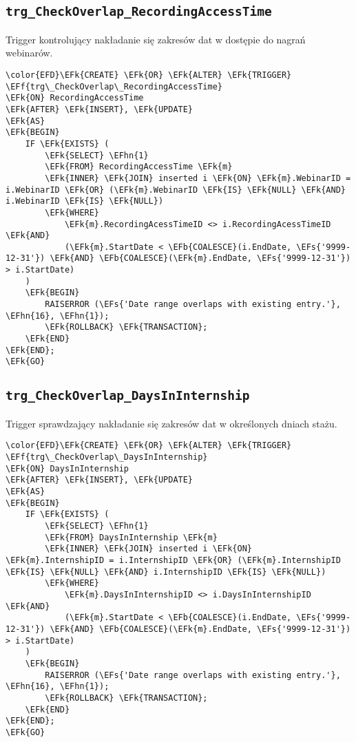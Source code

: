 \documentclass[11pt]{article}
\newcommand{\EFs}[1]{\textcolor{EFs}{#1}} %
\newcommand{\EFk}[1]{\textcolor{EFk}{\textbf{#1}}} %
\newcommand{\EFb}[1]{\textcolor{EFb}{\textbf{#1}}} %
\newcommand{\EFf}[1]{\textcolor{EFf}{#1}} %
\newcommand{\EFhn}[1]{\textcolor{EFhn}{#1}} %
\begin{document}
\subsection{\texttt{trg\_CheckOverlap\_RecordingAccessTime}}
\label{sec:org977cbdd}
Trigger kontrolujący nakładanie się zakresów dat w dostępie do nagrań webinarów.
\begin{Code}
\begin{Verbatim}
\color{EFD}\EFk{CREATE} \EFk{OR} \EFk{ALTER} \EFk{TRIGGER} \EFf{trg\_CheckOverlap\_RecordingAccessTime}
\EFk{ON} RecordingAccessTime
\EFk{AFTER} \EFk{INSERT}, \EFk{UPDATE}
\EFk{AS}
\EFk{BEGIN}
    IF \EFk{EXISTS} (
        \EFk{SELECT} \EFhn{1} 
        \EFk{FROM} RecordingAccessTime \EFk{m}
        \EFk{INNER} \EFk{JOIN} inserted i \EFk{ON} \EFk{m}.WebinarID = i.WebinarID \EFk{OR} (\EFk{m}.WebinarID \EFk{IS} \EFk{NULL} \EFk{AND} i.WebinarID \EFk{IS} \EFk{NULL})
        \EFk{WHERE} 
            \EFk{m}.RecordingAcessTimeID <> i.RecordingAcessTimeID \EFk{AND}
            (\EFk{m}.StartDate < \EFb{COALESCE}(i.EndDate, \EFs{'9999-12-31'}) \EFk{AND} \EFb{COALESCE}(\EFk{m}.EndDate, \EFs{'9999-12-31'}) > i.StartDate)
    )
    \EFk{BEGIN}
        RAISERROR (\EFs{'Date range overlaps with existing entry.'}, \EFhn{16}, \EFhn{1});
        \EFk{ROLLBACK} \EFk{TRANSACTION};
    \EFk{END}
\EFk{END};
\EFk{GO}
\end{Verbatim}
\end{Code}
\subsection{\texttt{trg\_CheckOverlap\_DaysInInternship}}
\label{sec:orge99d50f}
Trigger sprawdzający nakładanie się zakresów dat w określonych dniach stażu.
\begin{Code}
\begin{Verbatim}
\color{EFD}\EFk{CREATE} \EFk{OR} \EFk{ALTER} \EFk{TRIGGER} \EFf{trg\_CheckOverlap\_DaysInInternship}
\EFk{ON} DaysInInternship
\EFk{AFTER} \EFk{INSERT}, \EFk{UPDATE}
\EFk{AS}
\EFk{BEGIN}
    IF \EFk{EXISTS} (
        \EFk{SELECT} \EFhn{1} 
        \EFk{FROM} DaysInInternship \EFk{m}
        \EFk{INNER} \EFk{JOIN} inserted i \EFk{ON} \EFk{m}.InternshipID = i.InternshipID \EFk{OR} (\EFk{m}.InternshipID \EFk{IS} \EFk{NULL} \EFk{AND} i.InternshipID \EFk{IS} \EFk{NULL})
        \EFk{WHERE} 
            \EFk{m}.DaysInInternshipID <> i.DaysInInternshipID \EFk{AND}
            (\EFk{m}.StartDate < \EFb{COALESCE}(i.EndDate, \EFs{'9999-12-31'}) \EFk{AND} \EFb{COALESCE}(\EFk{m}.EndDate, \EFs{'9999-12-31'}) > i.StartDate)
    )
    \EFk{BEGIN}
        RAISERROR (\EFs{'Date range overlaps with existing entry.'}, \EFhn{16}, \EFhn{1});
        \EFk{ROLLBACK} \EFk{TRANSACTION};
    \EFk{END}
\EFk{END};
\EFk{GO}
\end{Verbatim}
\end{Code}
\end{document}
